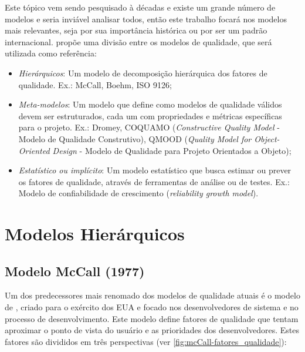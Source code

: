 \documentclass[
	12pt,				%
	openright,			%
	oneside,			%
	a4paper,			%
	english,			%
	brazil,				%
	]{abntex2}
\begin{document}
Este tópico vem sendo pesquisado à décadas e existe um grande número de modelos \cite{Klas2009} e seria inviável analisar todos, então este trabalho focará nos modelos mais relevantes, seja por sua importância histórica ou por ser um padrão internacional.  propõe uma divisão entre os modelos de qualidade, que será utilizada como referência:
\begin{itemize}
    \item \emph{Hierárquicos}: Um modelo de decomposição hierárquica dos fatores de qualidade. Ex.: McCall, Boehm, ISO 9126;
    \item \emph{Meta-modelos}: Um modelo que define como modelos de qualidade válidos devem ser estruturados, cada um com propriedades e métricas específicas para o projeto. Ex.: Dromey, COQUAMO (\emph{Constructive Quality Model} - Modelo de Qualidade Construtivo), QMOOD (\emph{Quality Model for Object-Oriented Design} - Modelo de Qualidade para Projeto Orientados a Objeto);
    \item \emph{Estatístico ou implícito}: Um modelo estatístico que busca estimar ou prever os fatores de qualidade, através de ferramentas de análise ou de testes. Ex.: Modelo de confiabilidade de crescimento (\emph{reliability growth model}).
\end{itemize}

\section{Modelos Hierárquicos}
\subsection{Modelo McCall (1977)}

Um dos predecessores mais renomado dos modelos de qualidade atuais é o modelo de , criado para o exército dos EUA e focado nos desenvolvedores de sistema e no processo de desenvolvimento. Este modelo define fatores de qualidade que tentam aproximar o ponto de vista do usuário e as prioridades dos desenvolvedores. Estes fatores são divididos em três perspectivas (ver \autoref{fig:mcCall-fatores_qualidade}):
\end{document}
